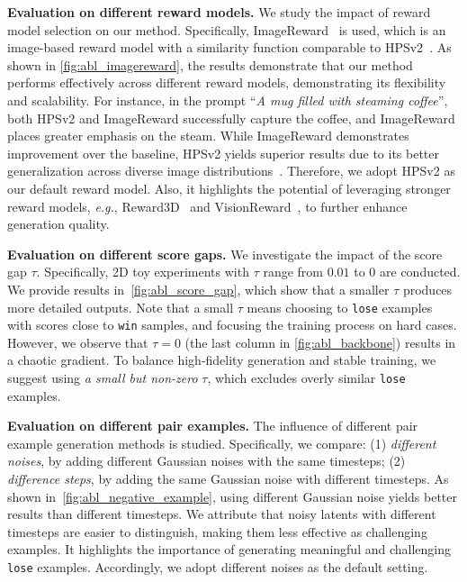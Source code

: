 \textbf{Evaluation on different reward models.} We study the impact of reward model selection on our method. Specifically, ImageReward~\citep{xu2024imagereward} is used, which is an image-based reward model with a similarity function comparable to HPSv2~\citep{wu2023human}. As shown in \cref{fig:abl_imagereward}, the results demonstrate that our method performs effectively across different reward models, demonstrating its flexibility and scalability. For instance, in the prompt ``\textit{A mug filled with steaming coffee}'', both HPSv2 and ImageReward successfully capture the coffee, and ImageReward places greater emphasis on the steam.
While ImageReward demonstrates improvement over the baseline, HPSv2 yields superior results due to its better generalization across diverse image distributions~\citep{wu2023human}. 
Therefore, we adopt HPSv2 as our default reward model. Also, it highlights the potential of leveraging stronger reward models, \textit{e.g.}, Reward3D~\citep{ye2025dreamreward} and VisionReward~\citep{xu2024visionreward}, to further enhance generation quality.



\textbf{Evaluation on different score gaps.} We investigate the impact of the score gap $\tau$. Specifically, 2D toy experiments with $\tau$ range from $0.01$ to $0$ are conducted. We provide results in~\cref{fig:abl_score_gap}, which show that a smaller $\tau$ produces more detailed outputs. Note that a small $\tau$ means choosing to \texttt{lose} examples with scores close to \texttt{win} samples, and focusing the training process on hard cases. However, we observe that $\tau = 0$ (the last column in \cref{fig:abl_backbone}) results in a chaotic gradient.
To balance high-fidelity generation and stable training, we suggest using \textit{a small but non-zero} $\tau$, which excludes overly similar \texttt{lose} examples.


\textbf{Evaluation on different pair examples.} The influence of different pair example generation methods is studied. Specifically, we compare: (1) \textit{different noises}, by adding different Gaussian noises with the same timesteps; (2) \textit{difference steps}, by adding the same Gaussian noise with different timesteps. As shown in~\cref{fig:abl_negative_example}, using different Gaussian noise yields better results than different timesteps. We attribute that noisy latents with different timesteps are easier to distinguish, making them less effective as challenging examples.
It highlights the importance of generating meaningful and challenging \texttt{lose} examples.  Accordingly, we adopt different noises as the default setting.


